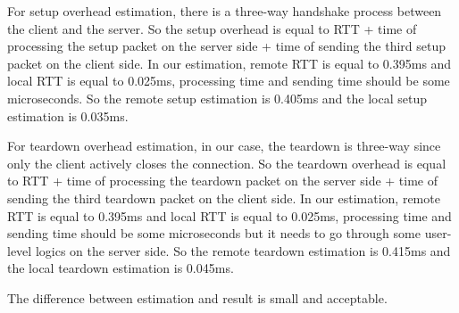For setup overhead estimation, there is a three-way handshake process between the client and the server. So the setup overhead is equal to RTT + time of processing the setup packet on the server side + time of sending the third setup packet on the client side. In our estimation, remote RTT is equal to 0.395ms and local RTT is equal to 0.025ms, processing time and sending time should be some microseconds. So the remote setup estimation is 0.405ms and the local setup estimation is 0.035ms.

For teardown overhead estimation, in our case, the teardown is three-way since only the client actively closes the connection. So the teardown overhead is equal to RTT + time of processing the teardown packet on the server side + time of sending the third teardown packet on the client side. In our estimation, remote RTT is equal to 0.395ms and local RTT is equal to 0.025ms, processing time and sending time should be some microseconds but it needs to go through some user-level logics on the server side. So the remote teardown estimation is 0.415ms and the local teardown estimation is 0.045ms.

The difference between estimation and result is small and acceptable.
